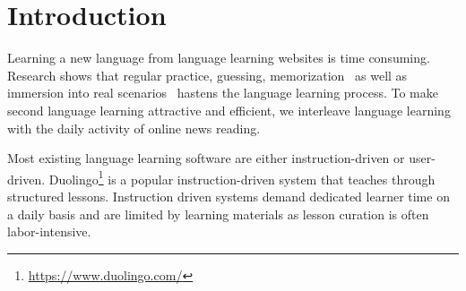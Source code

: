 \section{Introduction}
Learning a new language from language learning websites is time
consuming. Research shows that regular practice, guessing,
memorization~\cite{Rubin1975} as well as immersion into real
scenarios~\cite{Naiman1978} hastens the language learning process.  To
make second language learning attractive and efficient, we interleave
language learning with the daily activity of online news reading.



Most existing language learning software are either instruction-driven
or user-driven.  Duolingo\footnote{\url{https://www.duolingo.com/}} is
a popular instruction-driven system that teaches through structured
lessons.
Instruction driven systems demand dedicated learner time on a daily
basis and are limited by learning materials as lesson curation is
often labor-intensive.

